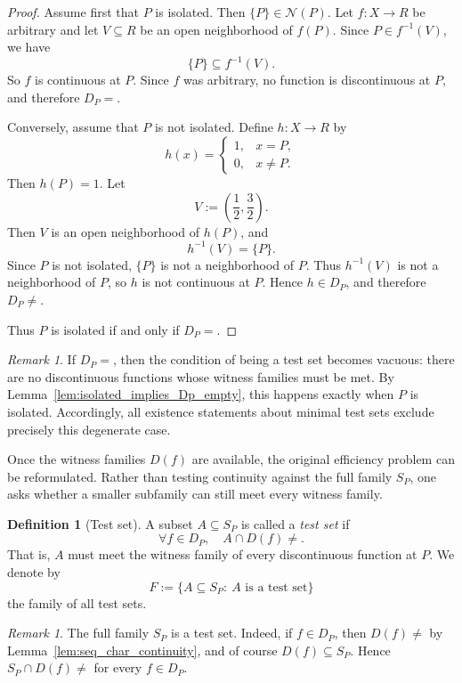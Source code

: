 \documentclass[11pt]{amsart}
\theoremstyle{plain}
\theoremstyle{definition}
\newtheorem{definition}[theorem]{Definition}
\theoremstyle{remark}
\newtheorem{remark}[theorem]{Remark}
\newcommand{\Sp}{\mathcal{S}_P}
\newcommand{\Dp}{\mathcal{D}_P}
\newcommand{\F}{\mathcal{F}}
\newcommand{\R}{\mathbb{R}}
\def\Sp{S_P}%
\def\Dp{D_P}%
\def\F{F}%
\def\R{R}%
\def\emptyset{}%
\begin{document}
\begin{proof}
Assume first that $P$ is isolated.
Then $\{P\}\in\mathcal N(P)$.
Let $f:X\to\R$ be arbitrary and let $V\subseteq\R$ be an open neighborhood of $f(P)$.
Since $P\in f^{-1}(V)$, we have
\[
\{P\}\subseteq f^{-1}(V).
\]
So $f$ is continuous at $P$.
Since $f$ was arbitrary, no function is discontinuous at $P$, and therefore $\Dp=\emptyset$.

Conversely, assume that $P$ is not isolated.
Define $h:X\to\R$ by
\[
h(x)=
\begin{cases}
1, & x=P,\\
0, & x\neq P.
\end{cases}
\]
Then $h(P)=1$.
Let
\[
V:=\left(\frac12,\frac32\right).
\]
Then $V$ is an open neighborhood of $h(P)$, and
\[
h^{-1}(V)=\{P\}.
\]
Since $P$ is not isolated, $\{P\}$ is not a neighborhood of $P$.
Thus $h^{-1}(V)$ is not a neighborhood of $P$, so $h$ is not continuous at $P$.
Hence $h\in\Dp$, and therefore $\Dp\neq\emptyset$.

Thus $P$ is isolated if and only if $\Dp=\emptyset$.
\end{proof}

\begin{remark}\label{rem:vacuous_case}
If $\Dp=\emptyset$, then the condition of being a test set becomes vacuous:
there are no discontinuous functions whose witness families must be met.
By Lemma~\ref{lem:isolated_implies_Dp_empty}, this happens exactly when $P$ is isolated.
Accordingly, all existence statements about minimal test sets exclude precisely this degenerate case.
\end{remark}

Once the witness families $D(f)$ are available, the original efficiency problem can be reformulated.
Rather than testing continuity against the full family $\Sp$, one asks whether a smaller subfamily can still meet every witness family.

\begin{definition}[Test set]\label{def:testset}
A subset $A\subseteq\Sp$ is called a \emph{test set} if
\[
\forall f\in\Dp,\quad A\cap D(f)\neq\emptyset.
\]
That is, $A$ must meet the witness family of every discontinuous function at $P$. We denote by
\[
\F:=\{A\subseteq\Sp:\ A \text{ is a test set}\}
\]
the family of all test sets.
\end{definition}

\begin{remark}\label{rem:Sp_is_testset}
The full family $\Sp$ is a test set.
Indeed, if $f\in\Dp$, then $D(f)\neq\emptyset$ by Lemma~\ref{lem:seq_char_continuity}, and of course $D(f)\subseteq\Sp$.
Hence $\Sp\cap D(f)\neq\emptyset$ for every $f\in\Dp$.
\end{remark}
\end{document}
